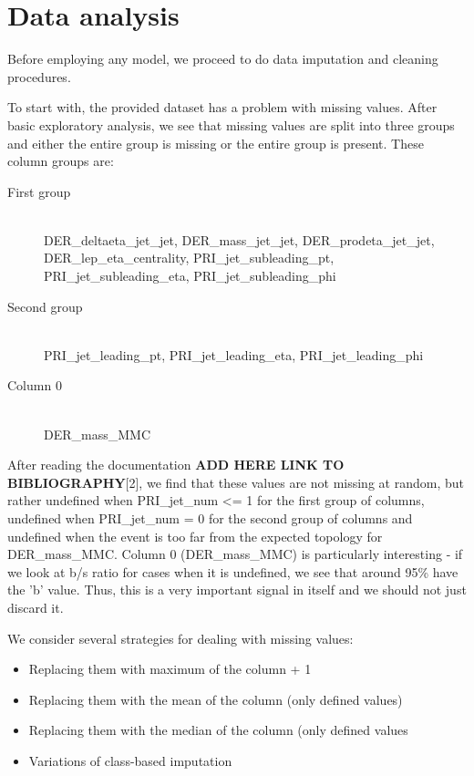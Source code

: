 \documentclass[10pt,conference,compsocconf]{IEEEtran}
\begin{document}
\section{Data analysis}
Before employing any model, we proceed to do data imputation and cleaning procedures.

To start with, the provided dataset has a problem with missing values. After basic exploratory analysis, we see that missing values are split into three groups and either the entire group is missing or the entire group is present. These column groups are:
\begin{description}
	\item[First group] \ \\
	DER\_deltaeta\_jet\_jet, DER\_mass\_jet\_jet, DER\_prodeta\_jet\_jet, DER\_lep\_eta\_centrality, PRI\_jet\_subleading\_pt, PRI\_jet\_subleading\_eta, PRI\_jet\_subleading\_phi
	\item[Second group] \ \\
	PRI\_jet\_leading\_pt, PRI\_jet\_leading\_eta, PRI\_jet\_leading\_phi
	\item[Column 0] \ \\
	DER\_mass\_MMC
\end{description}
  After reading the documentation \textbf{ADD HERE LINK TO BIBLIOGRAPHY}[2], we find that these values are not missing at random, but rather undefined when PRI\_jet\_num <= 1 for the first group of columns, undefined when PRI\_jet\_num = 0 for the second group of columns and undefined when the event is too far from the expected topology for DER\_mass\_MMC. Column 0 (DER\_mass\_MMC) is particularly interesting - if we look at b/s ratio for cases when it is undefined, we see that around 95\% have the 'b' value. Thus, this is a very important signal in itself and we should not just discard it.
  
  We consider several strategies for dealing with missing values:
  \begin{itemize}
  	\item Replacing them with maximum of the column + 1
  	\item Replacing them with the mean of the column (only defined values)
  	\item Replacing them with the median of the column (only defined values
  	\item Variations of class-based imputation
  \end{itemize}
\end{document}
